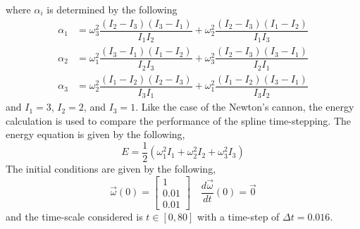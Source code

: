 \documentclass{article}
\begin{document}
where $\alpha_i$ is determined by the following
\begin{align}
\alpha_1 &= \omega^2_3\dfrac{(I_2 - I_3)(I_3 - I_1)}{I_1 I_2}+\omega^2_2\dfrac{(I_2 - I_3)(I_1 - I_2)}{I_1I_3}\\
\alpha_2 &= \omega^2_1\dfrac{(I_3 - I_1)(I_1 - I_2)}{I_2 I_3}+\omega^2_3\dfrac{(I_2 - I_3)(I_3 - I_1)}{I_2I_1}\\
\alpha_3 &= \omega^2_2\dfrac{(I_1 - I_2)(I_2 - I_3)}{I_3 I_1}+\omega^2_1\dfrac{(I_1 - I_2)(I_3 - I_1)}{I_3I_2}
\end{align}
and $I_1 = 3$, $I_2 = 2$, and $I_3 = 1$. Like the case of the Newton's cannon, the energy calculation is used to compare the performance of the spline time-stepping. The energy equation is given by the following,
\begin{equation}
E = \dfrac{1}{2}\left(\omega^2_1I_1+\omega^2_2I_2+\omega^2_3I_3\right)
\end{equation}
The initial conditions are given by the following, 
\begin{equation*}
\vec{\omega}(0) = \begin{bmatrix}
1\\0.01\\0.01
\end{bmatrix}\quad \dfrac{d\vec{\omega}}{dt}(0) = \vec{0}
\end{equation*}
and the time-scale considered is $t\in \left[0,80\right]$ with a time-step of $\Delta t = 0.016$.
\end{document}
